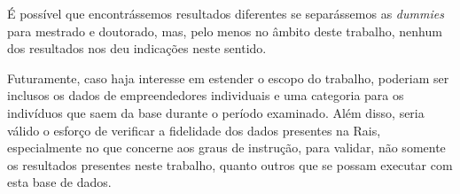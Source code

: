 \documentclass[a4paper]{article}
\begin{document}
É possível que encontrássemos resultados diferentes se separássemos as \textit{dummies} para mestrado e doutorado, mas, pelo menos no âmbito deste trabalho, nenhum dos resultados nos deu indicações neste sentido.

Futuramente, caso haja interesse em estender o escopo do trabalho, poderiam ser inclusos os dados de empreendedores individuais e uma categoria para os indivíduos que saem da base durante o período examinado. Além disso, seria válido o esforço de verificar a fidelidade dos dados presentes na Rais, especialmente no que concerne aos graus de instrução, para validar, não somente os resultados presentes neste trabalho, quanto outros que se possam executar com esta base de dados.




\end{document}
